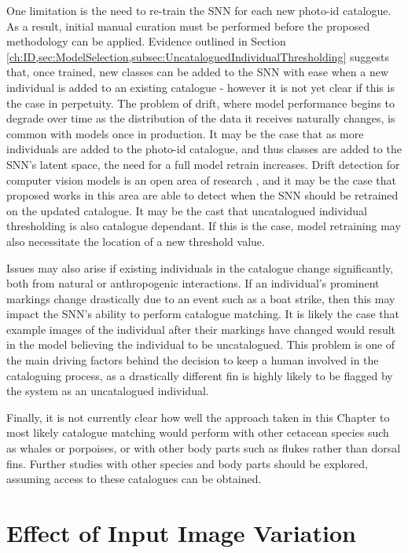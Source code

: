 One limitation is the need to re-train the SNN for each new photo-id catalogue. As a result, initial manual curation must be performed before the proposed methodology can be applied. Evidence outlined in Section \ref{ch:ID,sec:ModelSelection,subsec:UncataloguedIndividualThresholding} suggests that, once trained, new classes can be added to the SNN with ease when a new individual is added to an existing catalogue - however it is not yet clear if this is the case in perpetuity. The problem of drift, where model performance begins to degrade over time as the distribution of the data it receives naturally changes, is common with models once in production. It may be the case that as more individuals are added to the photo-id catalogue, and thus classes are added to the SNN's latent space, the need for a full model retrain increases. Drift detection for computer vision models is an open area of research \cite{siva_weakly_2011, suprem_odin_2020, nagar_concept_2020, cobb_context-aware_2022}, and it may be the case that proposed works in this area are able to detect when the SNN should be retrained on the updated catalogue. It may be the cast that uncatalogued individual thresholding is also catalogue dependant. If this is the case, model retraining may also necessitate the location of a new threshold value. 

Issues may also arise if existing individuals in the catalogue change significantly, both from natural or anthropogenic interactions. If an individual's prominent markings change drastically due to an event such as a boat strike, then this may impact the SNN's ability to perform catalogue matching. It is likely the case that example images of the individual after their markings have changed would result in the model believing the individual to be uncatalogued. This problem is one of the main driving factors behind the decision to keep a human involved in the cataloguing process, as a drastically different fin is highly likely to be flagged by the system as an uncatalogued individual. 

Finally, it is not currently clear how well the approach taken in this Chapter to most likely catalogue matching would perform with other cetacean species such as whales or porpoises, or with other body parts such as flukes rather than dorsal fins. Further studies with other species and body parts should be explored, assuming access to these catalogues can be obtained. 

\section{Effect of Input Image Variation}\label{ch:ID,sec:EffectOfInputImageVariation}

